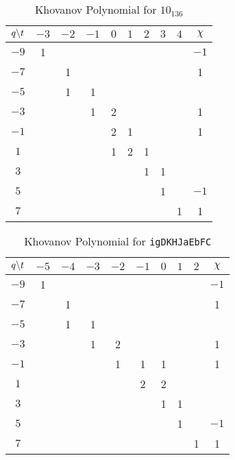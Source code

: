 \begin{table}
    \centering
    \begin{tabular}{| c | c | c | c | c | c | c | c | c | c |}
        \hline
        $q\symbol{92}t$&$-3$&$-2$&$-1$&$0$&$1$&$2$&$3$&$4$&$\chi$\\
        \hline
        $-9$&1&&&&&&&&$-1$\\
        \hline
        $-7$&&1&&&&&&&1\\
        \hline
        $-5$&&1&1&&&&&&\\
        \hline
        $-3$&&&1&2&&&&&1\\
        \hline
        $-1$&&&&2&1&&&&1\\
        \hline
        $1$&&&&1&2&1&&&\\
        \hline
        $3$&&&&&&1&1&&\\
        \hline
        $5$&&&&&&&1&&$-1$\\
        \hline
        $7$&&&&&&&&1&1\\
        \hline
    \end{tabular}
    \caption{Khovanov Polynomial for $10_{136}$}
\end{table}
\begin{table}
    \centering
    \begin{tabular}{| c | c | c | c | c | c | c | c | c | c |}
        \hline
        $q\symbol{92}t$&$-5$&$-4$&$-3$&$-2$&$-1$&$0$&$1$&$2$&$\chi$\\
        \hline
        $-9$&1&&&&&&&&$-1$\\
        \hline
        $-7$&&1&&&&&&&1\\
        \hline
        $-5$&&1&1&&&&&&\\
        \hline
        $-3$&&&1&2&&&&&1\\
        \hline
        $-1$&&&&1&1&1&&&1\\
        \hline
        $1$&&&&&2&2&&&\\
        \hline
        $3$&&&&&&1&1&&\\
        \hline
        $5$&&&&&&&1&&$-1$\\
        \hline
        $7$&&&&&&&&1&1\\
        \hline
    \end{tabular}
    \caption{Khovanov Polynomial for \texttt{igDKHJaEbFC}}
\end{table}
